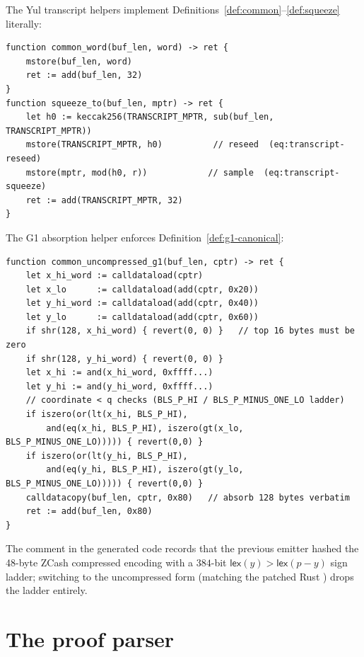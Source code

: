 The Yul transcript helpers implement Definitions~\ref{def:common}--\ref{def:squeeze}
literally:
\begin{lstlisting}[style=yul]
function common_word(buf_len, word) -> ret {
    mstore(buf_len, word)
    ret := add(buf_len, 32)
}
function squeeze_to(buf_len, mptr) -> ret {
    let h0 := keccak256(TRANSCRIPT_MPTR, sub(buf_len, TRANSCRIPT_MPTR))
    mstore(TRANSCRIPT_MPTR, h0)          // reseed  (eq:transcript-reseed)
    mstore(mptr, mod(h0, r))            // sample  (eq:transcript-squeeze)
    ret := add(TRANSCRIPT_MPTR, 32)
}
\end{lstlisting}
The G1 absorption helper enforces Definition~\ref{def:g1-canonical}:
\begin{lstlisting}[style=yul]
function common_uncompressed_g1(buf_len, cptr) -> ret {
    let x_hi_word := calldataload(cptr)
    let x_lo      := calldataload(add(cptr, 0x20))
    let y_hi_word := calldataload(add(cptr, 0x40))
    let y_lo      := calldataload(add(cptr, 0x60))
    if shr(128, x_hi_word) { revert(0, 0) }   // top 16 bytes must be zero
    if shr(128, y_hi_word) { revert(0, 0) }
    let x_hi := and(x_hi_word, 0xffff...)
    let y_hi := and(y_hi_word, 0xffff...)
    // coordinate < q checks (BLS_P_HI / BLS_P_MINUS_ONE_LO ladder)
    if iszero(or(lt(x_hi, BLS_P_HI),
        and(eq(x_hi, BLS_P_HI), iszero(gt(x_lo, BLS_P_MINUS_ONE_LO))))) { revert(0,0) }
    if iszero(or(lt(y_hi, BLS_P_HI),
        and(eq(y_hi, BLS_P_HI), iszero(gt(y_lo, BLS_P_MINUS_ONE_LO))))) { revert(0,0) }
    calldatacopy(buf_len, cptr, 0x80)   // absorb 128 bytes verbatim
    ret := add(buf_len, 0x80)
}
\end{lstlisting}
The comment in the generated code records that the previous emitter hashed
the 48-byte ZCash compressed encoding with a $384$-bit
$\mathsf{lex}(y) > \mathsf{lex}(p-y)$ sign ladder; switching to the
uncompressed form (matching the patched Rust ) drops the
ladder entirely.

\section{The proof parser}
\label{sec:sol-parser}

